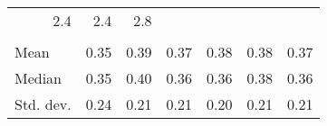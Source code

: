 \begin{tabular}{lllllll}
  \multicolumn{1}{r}{2.4} &
  \multicolumn{1}{r}{2.4} &
  \multicolumn{1}{r}{2.8} \\
\multicolumn{1}{l}{\hspace{1em}{\textit{Elasticity } ($\widehat{\beta}$)}} &
  \multicolumn{1}{|r}{} &
  \multicolumn{1}{r}{} &
  \multicolumn{1}{r}{} &
  \multicolumn{1}{r}{} &
  \multicolumn{1}{r}{} &
  \multicolumn{1}{r}{} \\
\multicolumn{1}{l}{\hspace{2em}Mean} &
  \multicolumn{1}{|r}{0.35} &
  \multicolumn{1}{r}{0.39} &
  \multicolumn{1}{r}{0.37} &
  \multicolumn{1}{r}{0.38} &
  \multicolumn{1}{r}{0.38} &
  \multicolumn{1}{r}{0.37} \\
\multicolumn{1}{l}{\hspace{2em}Median} &
  \multicolumn{1}{|r}{0.35} &
  \multicolumn{1}{r}{0.40} &
  \multicolumn{1}{r}{0.36} &
  \multicolumn{1}{r}{0.36} &
  \multicolumn{1}{r}{0.38} &
  \multicolumn{1}{r}{0.36} \\
\multicolumn{1}{l}{\hspace{2em}Std. dev.} &
  \multicolumn{1}{|r}{0.24} &
  \multicolumn{1}{r}{0.21} &
  \multicolumn{1}{r}{0.21} &
  \multicolumn{1}{r}{0.20} &
  \multicolumn{1}{r}{0.21} &
  \multicolumn{1}{r}{0.21} \\
\cline{1-7}
\end{tabular}
